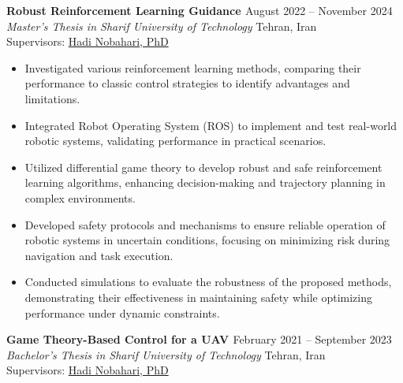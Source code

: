 \documentclass[12pt]{article}
\begin{document}
\vspace{0.2in}
\noindent
{\bfseries  Robust Reinforcement Learning Guidance
\href{https://github.com/CNAVLAB}{\faGithub}
} \hfill August 2022 -- November 2024 \\ 
\noindent \textit{Master's Thesis in Sharif University of Technology} \hfill Tehran, Iran \\ 
\noindent Supervisors: 
\href{https://ae.sharif.edu/~portal/faculty/1091235256}{Hadi Nobahari, PhD}

\begin{itemize} \itemsep -4pt %
	\item Investigated various reinforcement learning methods, comparing their performance to classic control strategies to identify advantages and limitations.
	\item Integrated Robot Operating System (ROS) to implement and test real-world robotic systems, validating performance in practical scenarios.
	\item Utilized differential game theory to develop robust and safe reinforcement learning algorithms, enhancing decision-making and trajectory planning in complex environments.
	\item Developed safety protocols and mechanisms to ensure reliable operation of robotic systems in uncertain conditions, focusing on minimizing risk during navigation and task execution.
	\item Conducted simulations to evaluate the robustness of the proposed methods, demonstrating their effectiveness in maintaining safety while optimizing performance under dynamic constraints.
\end{itemize}


\newpage
\noindent
{\bfseries Game Theory-Based Control for a UAV 
\href{https://github.com/alibaniasad1999/bachelor-thesis}{\faGithub}
\textcolor{red}{
\href{https://youtu.be/SXZACxGaE1A?si=61yCRB8jFIZlldFG}{\faYoutube}}
} \hfill February 2021 -- September 2023 \\ 
\noindent \textit{Bachelor's Thesis in Sharif University of Technology} \hfill Tehran, Iran \\ 
\noindent Supervisors: 
\href{https://ae.sharif.edu/~portal/faculty/1091235256}{Hadi Nobahari, PhD} 
\end{document}
